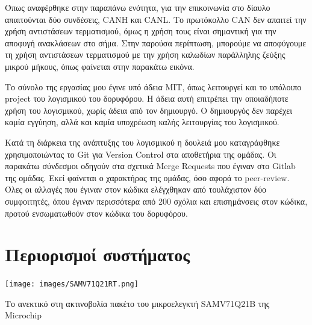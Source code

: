 \documentclass[a4paper,nobib,justified]{tufte-book}
\begin{document}
Όπως αναφέρθηκε στην παραπάνω ενότητα, για την επικοινωνία στο δίαυλο απαιτούνται δύο συνδέσεις, CANH και CANL. Το πρωτόκολλο CAN δεν απαιτεί την χρήση αντιστάσεων τερματισμού, όμως η χρήση τους είναι σημαντική για την αποφυγή ανακλάσεων στο σήμα. Στην παρούσα περίπτωση, μπορούμε να αποφύγουμε τη χρήση αντιστάσεων τερματισμού με την χρήση καλωδίων παράλληλης ζεύξης μικρού μήκους, όπως φαίνεται στην παρακάτω εικόνα.


Το σύνολο της εργασίας μου έγινε υπό άδεια MIT, όπως λειτουργεί και το υπόλοιπο project του λογισμικού του δορυφόρου. Η άδεια αυτή επιτρέπει την οποιαδήποτε χρήση του λογισμικού, χωρίς άδεια από τον δημιουργό. Ο δημιουργός δεν παρέχει καμία εγγύηση, αλλά και καμία υποχρέωση καλής λειτουργίας του λογισμικού. 

Κατά τη διάρκεια της ανάπτυξης του λογισμικού η δουλειά μου καταγράφθηκε χρησιμοποιώντας το Git για Version Control στα αποθετήρια της ομάδας. Οι παρακάτω σύνδεσμοι οδηγούν στα σχετικά Merge Requests που έγιναν στο Gitlab της ομάδας. Εκεί φαίνεται ο χαρακτήρας της ομάδας, όσο αφορά το peer-review. Όλες οι αλλαγές που έγιναν στον κώδικα ελέγχθηκαν από τουλάχιστον δύο συμφοιτητές, όπου έγιναν περισσότερα από 200 σχόλια και επισημάνσεις στον κώδικα, προτού ενσωματωθούν στον κώδικα του δορυφόρου. 

\clearpage
\section{Περιορισμοί συστήματος}

\begin{marginfigure}
	\centering
	\texttt{[image: images/SAMV71Q21RT.png]}
	\label{fig:samv71-rad-mcu}
	\caption[Το ανεκτικό στη ακτινοβολία πακέτο του μικροελεγκτή SAMV71Q21B της Microchip]{Το ανεκτικό στη ακτινοβολία πακέτο του μικροελεγκτή SAMV71Q21B της Microchip}
\end{marginfigure}
\end{document}

